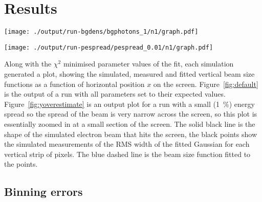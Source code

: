
\section{Results}
\label{sec:results}

\begin{figure*}%
	\begin{minipage}[t]{\columnwidth}
			\centering
			\texttt{[image: ./output/run-bgdens/bgphotons\_1/n1/graph.pdf]}
			\caption{
				The beam reconstruction (blue line) of a sumlation run with all the
				expected parameter values. \(E = \SI{1.3}{\giga\electronvolt}\),
				\(\sigma_E = \SI{0.4}{\giga\electronvolt}\), \(\epsilon =
				\SI{1}{\milli\meter\milli\radian}\)
			}
			\label{fig:default}
	\end{minipage}\hfill
	\begin{minipage}[t]{\columnwidth}
			\centering
			\texttt{[image: ./output/run-pespread/pespread\_0.01/n1/graph.pdf]}
			\caption{
				The beam reconstruction, consistently overestimates the vertical
				beam size. This run used a small percentage energy spread of
				\SI{1}{\percent}. With all other parameters set to their expected
				value.
			}
			\label{fig:yoverestimate}
	\end{minipage}
\end{figure*}

Along with the \(\chi^2\) minimised parameter values of the fit, each simulation
generated a plot, showing the simulated, measured and fitted vertical beam size
functions as a function of horizontal position \(x\) on the screen.
Figure~\ref{fig:default} is the output of a run with all parameters set to their
expected values.  Figure~\ref{fig:yoverestimate} is an output plot for a run
with a small (\SI{1}{\percent}) energy spread so the spread of the beam is very
narrow across the screen, so this plot is essentially zoomed in at a small
section of the screen. The solid black line is the shape of the simulated
electron beam that hits the screen, the black points show the simulated
measurements of the RMS width of the fitted Gaussian for each vertical strip of
pixels. The blue dashed line is the beam size function fitted to the points.

\subsection{Binning errors}

